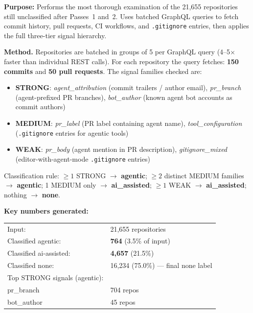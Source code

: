 \documentclass[11pt,a4paper]{article}
\begin{document}
\begin{infobox}
\textbf{Purpose:} Performs the most thorough examination of the 21,655
repositories still unclassified after Passes~1 and~2. Uses batched
GraphQL queries to fetch commit history, pull requests, CI workflows, and
\texttt{.gitignore} entries, then applies the full three-tier signal hierarchy.
\end{infobox}

\textbf{Method.}
Repositories are batched in groups of 5 per GraphQL query (4--5$\times$ faster
than individual REST calls). For each repository the query fetches:
\textbf{150 commits} and \textbf{50 pull requests}. The signal families
checked are:
\begin{itemize}
  \item \textbf{STRONG}: \textit{agent\_attribution} (commit trailers / author email),
        \textit{pr\_branch} (agent-prefixed PR branches),
        \textit{bot\_author} (known agent bot accounts as commit authors)
  \item \textbf{MEDIUM}: \textit{pr\_label} (PR label containing agent name),
        \textit{tool\_configuration} (\texttt{.gitignore} entries for agentic tools)
  \item \textbf{WEAK}: \textit{pr\_body} (agent mention in PR description),
        \textit{gitignore\_mixed} (editor-with-agent-mode \texttt{.gitignore} entries)
\end{itemize}
Classification rule: $\geq 1$ STRONG $\rightarrow$ \textbf{agentic};
$\geq 2$ distinct MEDIUM families $\rightarrow$ \textbf{agentic};
1 MEDIUM only $\rightarrow$ \textbf{ai\_assisted};
$\geq 1$ WEAK $\rightarrow$ \textbf{ai\_assisted}; nothing $\rightarrow$ \textbf{none}.

\begin{numbersbox}
\textbf{Key numbers generated:}\\[2pt]
\begin{tabular}{@{}ll@{}}
Input:                           & 21,655 repositories \\
Classified agentic:              & \textbf{764} (3.5\% of input) \\
Classified ai-assisted:          & \textbf{4,657} (21.5\%) \\
Classified none:                 & 16,234 (75.0\%) --- final none label \\[4pt]
Top STRONG signals (agentic):    & \\
\quad pr\_branch                 & 704 repos \\
\quad bot\_author                & 45 repos \\
\end{tabular}
\end{numbersbox}
\end{document}
